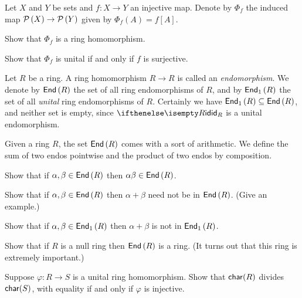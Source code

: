 \begin{exercise}
Let \(X\) and \(Y\) be sets and \(f : X \rightarrow Y\) an injective map.
Denote by \(\Phi_f\) the induced map \(\mathcal{P}\left(X\right) \rightarrow \mathcal{P}\left(Y\right)\) given by \(\Phi_f(A) = f[A]\).
\begin{proplist}
\item Show that \(\Phi_f\) is a ring homomorphism.
\item Show that \(\Phi_f\) is unital if and only if \(f\) is surjective.
\end{proplist}
\end{exercise}


\begin{dfn}[Endomorphism] \label{dfn:endo}
Let \(R\) be a ring.
A ring homomorphism \(R \rightarrow R\) is called an \emph{endomorphism}.
We denote by \( \mathsf{End}\left(R\right) \) the set of all ring endomorphisms of \(R\), and by \( \mathsf{End}_1\left(R\right) \) the set of all \emph{unital} ring endomorphisms of \(R\).
Certainly we have \( \mathsf{End}_1\left(R\right)  \subseteq  \mathsf{End}\left(R\right) \), and neither set is empty, since \(\ID[R]\) is a unital endomorphism.
\end{dfn}


\begin{exercise}
Given a ring \(R\), the set \( \mathsf{End}\left(R\right) \) comes with a sort of arithmetic.
We define the sum of two endos pointwise and the product of two endos by composition.
\begin{proplist}
\item Show that if \(\alpha, \beta \in  \mathsf{End}\left(R\right) \) then \(\alpha\beta \in  \mathsf{End}\left(R\right) \).
\item Show that if \(\alpha, \beta \in  \mathsf{End}\left(R\right) \) then \(\alpha + \beta\) need not be in \( \mathsf{End}\left(R\right) \).
(Give an example.)
\item Show that if \(\alpha, \beta \in  \mathsf{End}_1\left(R\right) \) then \(\alpha + \beta\) is not in \( \mathsf{End}_1\left(R\right) \).
\end{proplist}
\end{exercise}


\begin{exercise}
Show that if \(R\) is a null ring then \( \mathsf{End}\left(R\right) \) is a ring.
(It turns out that this ring is extremely important.)
\end{exercise}


\begin{exercise}
Suppose \(\varphi : R \rightarrow S\) is a unital ring homomorphism.
Show that \(\mathsf{char}(R)\) divides \(\mathsf{char}(S)\), with equality if and only if \(\varphi\) is injective.
\end{exercise}
